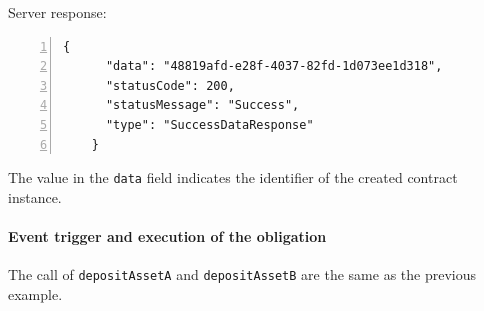 Server response:
{
  \small
  \begin{Verbatim}[numbers=left,xleftmargin=1cm,firstnumber=1,breaklines=true,breakanywhere=true,tabsize=2]
    {
      "data": "48819afd-e28f-4037-82fd-1d073ee1d318",
      "statusCode": 200,
      "statusMessage": "Success",
      "type": "SuccessDataResponse"
    }
  \end{Verbatim}
}

The value in the \verb|data| field indicates the identifier of the created contract instance.

\paragraph{Event trigger and execution of the obligation}

The call of \verb|depositAssetA| and \verb|depositAssetB| are the same as the previous example. 

